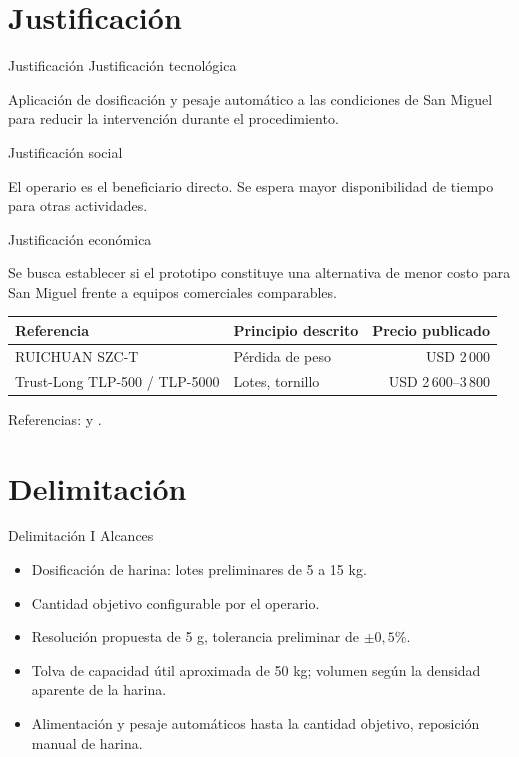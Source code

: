 \documentclass[aspectratio=169,spanish]{beamer}
\newcommand{\fuente}[1]{\par\vfill{\scriptsize #1}}
\begin{document}
\section{Justificación}
\begin{frame}{Justificación}
\relax
{\large\color{UCBBlue}Justificación tecnológica}
\par\smallskip
{\small Aplicación de dosificación y pesaje automático a las condiciones de San Miguel
para reducir la intervención durante el procedimiento.}
\par\smallskip
{\large\color{UCBBlue}Justificación social}
\par\smallskip
{\small El operario es el beneficiario directo. Se espera mayor disponibilidad de
tiempo para otras actividades.}
\par\smallskip
{\large\color{UCBBlue}Justificación económica}
\par\smallskip
{\small Se busca establecer si el prototipo constituye una alternativa de menor costo
para San Miguel frente a equipos comerciales comparables.}
\par\smallskip
{\centering\footnotesize\renewcommand{\arraystretch}{1.0}
\begin{tabular}{@{}llr@{}}
\toprule
\textbf{Referencia} & \textbf{Principio descrito} & \textbf{Precio publicado}\\
\midrule
RUICHUAN SZC-T & Pérdida de peso & USD 2\,000\\
Trust-Long TLP-500 / TLP-5000 & Lotes, tornillo & USD 2\,600--3\,800\\
\bottomrule
\end{tabular}\par}
\fuente{Referencias: \textcite{UnidadDosificadoraGravimetrica} y \textcite{MaquinaLlenadoPolvo}.}
\end{frame}

\section{Delimitación}
\begin{frame}{Delimitación I}
\relax
{\large\color{UCBBlue}Alcances}
\begin{itemize}
\setlength{\itemsep}{0.20cm}
\item Dosificación de harina: lotes preliminares de 5 a 15 kg.
\item Cantidad objetivo configurable por el operario.
\item Resolución propuesta de 5 g, tolerancia preliminar de $\pm 0{,}5$\%.
\item Tolva de capacidad útil aproximada de 50 kg; volumen según la densidad aparente de la harina.
\item Alimentación y pesaje automáticos hasta la cantidad objetivo, reposición manual de harina.
\end{itemize}
\end{frame}
\end{document}
